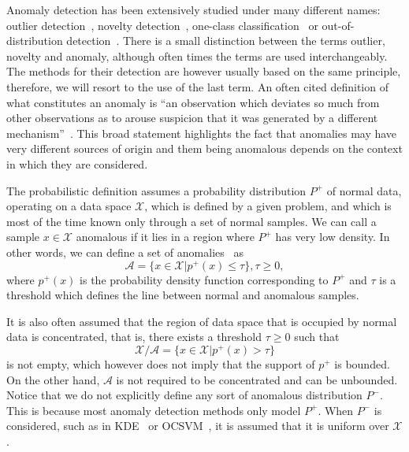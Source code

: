 
Anomaly detection has been extensively studied under many different names: outlier detection~\cite{knorr98algorithms,hodge2004survey}, novelty detection~\cite{pimentel2014review}, one-class classification~\cite{ruff2018deep} or out-of-distribution detection~\cite{liang2017enhancing}. There is a small distinction between the terms outlier, novelty and anomaly, although often times the terms are used interchangeably. The methods for their detection are however usually based on the same principle, therefore, we will resort to the use of the last term. An often cited definition of what constitutes an anomaly is ``an observation which deviates so much from other observations as to arouse suspicion that it was generated by a different mechanism''~\cite{barnett1974outliers}. This broad statement highlights the fact that anomalies may have very different sources of origin and them being anomalous depends on the context in which they are considered. 

The probabilistic definition assumes a probability distribution $P^+$ of normal data, operating on a data space $\mathcal{X}$, which is defined by a given problem, and which is most of the time known only through a set of normal samples. We can call a sample $x \in \mathcal{X}$ anomalous if it lies in a region where $P^+$ has very low density. In other words, we can define a set of anomalies~\cite{ruff2020unifying} as 
\begin{equation} \label{eq:anomaly_set}
	\mathcal{A} = \lbrace x \in \mathcal{X} \vert p^+(x) \leq \tau \rbrace, \tau \geq 0,
\end{equation}
where $p^+(x)$ is the probability density function corresponding to $P^+$ and $\tau$ is a threshold which defines the line between normal and anomalous samples. 

It is also often assumed that the region of data space that is occupied by normal data is concentrated, that is, there exists a threshold $\tau \geq 0$ such that
\begin{equation} \label{eq:anomaly_set}
	\mathcal{X} \slash \mathcal{A} = \lbrace x \in \mathcal{X} \vert p^+(x) > \tau \rbrace
\end{equation}
is not empty, which however does not imply that the support of $p^+$ is bounded. On the other hand, $\mathcal{A}$ is not required to be concentrated and can be unbounded. Notice that we do not explicitly define any sort of anomalous distribution $P^-$. This is because most anomaly detection methods only model $P^+$. When $P^-$ is considered, such as in KDE~\cite{parzen1962estimation} or OCSVM~\cite{scholkopf2001estimating}, it is assumed that it is uniform over $\mathcal{X}$. 

